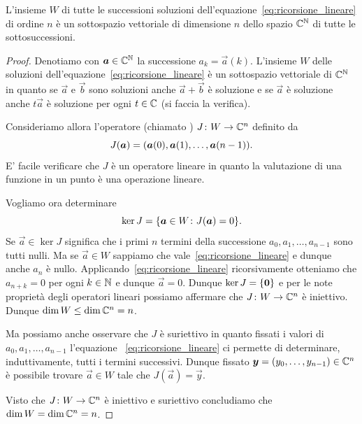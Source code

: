 \begin{theorem}
\label{th:dimensione_ricorsione_lineare}
L'insieme $W$ di tutte le successioni soluzioni dell'equazione~\eqref{eq:ricorsione_lineare}
di ordine $n$
è un sottospazio vettoriale di dimensione $n$
dello spazio $\mathbb C^\mathbb N$ di tutte le sottosuccessioni.
\end{theorem}
%
\begin{proof}
Denotiamo con $\boldsymbol a \in \mathbb C^\mathbb N$ la successione $a_k = \vec a(k)$.
L'insieme $W$ delle soluzioni dell'equazione~\eqref{eq:ricorsione_lineare}
è un sottospazio vettoriale di $\mathbb C^\mathbb N$ in quanto se $\vec a$
e $\vec b$ sono soluzioni anche $\vec a + \vec b$ è soluzione e se $\vec a$
è soluzione anche $t \vec a$ è soluzione per ogni $t\in \mathbb C$
(si faccia la verifica).

Consideriamo allora l'operatore (chiamato ) $J\colon W \to \mathbb C^n$
definito da
\[
  J(\boldsymbol a) = {\left( \boldsymbol a(0), \boldsymbol a(1), \dots, \boldsymbol a(n-1) \right)}.
\]
E' facile verificare che $J$ è un operatore lineare in quanto la valutazione
di una funzione in un punto è una operazione lineare.

Vogliamo ora determinare
\[
  \ker J = {\left\{ \boldsymbol a \in W \colon J(\boldsymbol a)=0 \right\}}.
\]
Se $\vec a\in \ker J$ significa che i primi $n$ termini
della successione
$a_0, a_1, \dots, a_{n-1}$ sono tutti nulli.
Ma se $\vec a\in W$ sappiamo che vale~\eqref{eq:ricorsione_lineare} e dunque
anche $a_n$ è nullo. Applicando~\eqref{eq:ricorsione_lineare} ricorsivamente
otteniamo che $a_{n+k}=0$ per ogni $k\in \mathbb N$ e dunque $\vec a = 0$.
Dunque $\ker J = {\left\{ \boldsymbol 0 \right\}}$
e per le note proprietà degli operatori lineari possiamo
affermare che $J\colon W \to \mathbb C^n$ è iniettivo.
Dunque $\dim W \le \dim \mathbb C^n = n$.

Ma possiamo anche osservare che $J$ è suriettivo in quanto
fissati i valori di $a_0,a_1, \dots, a_{n-1}$ l'equazione
~\eqref{eq:ricorsione_lineare} ci permette di determinare,
induttivamente, tutti i termini successivi. Dunque
fissato $\boldsymbol y = (y_0, \dots, y_{n-1}) \in \mathbb C^n$
è possibile trovare $\vec a \in W$ tale che $J(\vec a) = \vec y$.

Visto che $J\colon W\to\mathbb C^n$ è iniettivo e suriettivo
concludiamo che $\dim W = \dim \mathbb C^n = n$.
\end{proof}

